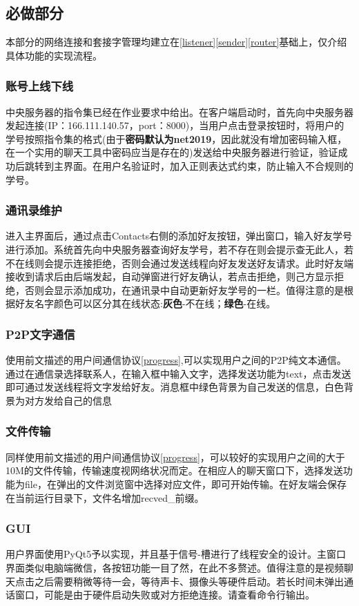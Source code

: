 \documentclass[UTF8]{ctexart}
\begin{document}
\subsection{必做部分}
本部分的网络连接和套接字管理均建立在\ref{listener}\ref{sender}\ref{router}基础上，仅介绍具体功能的实现流程。
\subsubsection{账号上线下线}
中央服务器的指令集已经在作业要求中给出。在客户端启动时，首先向中央服务器发起连接(IP：166.111.140.57，port：8000)，当用户点击登录按钮时，将用户的学号按照指令集的格式(由于\textbf{密码默认为net2019}，因此就没有增加密码输入框，在一个实用的聊天工具中密码应当是存在的)发送给中央服务器进行验证，验证成功后跳转到主界面。在用户名验证时，加入正则表达式约束，防止输入不合规则的学号。
\subsubsection{通讯录维护}
进入主界面后，通过点击Contacts右侧的添加好友按钮，弹出窗口，输入好友学号进行添加。系统首先向中央服务器查询好友学号，若不存在则会提示查无此人，若不在线则会提示连接拒绝，否则会通过发送线程向好友发送好友请求。此时好友端接收到请求后由后端发起，自动弹窗进行好友确认，若点击拒绝，则己方显示拒绝，否则会显示添加成功，在通讯录中自动更新好友学号的一栏。值得注意的是根据好友名字颜色可以区分其在线状态:\textbf{灰色}-不在线；\textbf{绿色}-在线。
\subsubsection{P2P文字通信}
使用前文描述的用户间通信协议\ref{progress},可以实现用户之间的P2P纯文本通信。通过在通信录选择联系人，在输入框中输入文字，选择发送功能为text，点击发送即可通过发送线程将文字发给好友。消息框中绿色背景为自己发送的信息，白色背景为对方发给自己的信息

\subsubsection{文件传输}
同样使用前文描述的用户间通信协议\ref{progress}，可以较好的实现用户之间的大于10M的文件传输，传输速度视网络状况而定。在相应人的聊天窗口下，选择发送功能为file，在弹出的文件浏览窗中选择对应文件，即可开始传输。在好友端会保存在当前运行目录下，文件名增加recved\_前缀。
\subsubsection{GUI}
用户界面使用PyQt5予以实现，并且基于信号-槽进行了线程安全的设计。主窗口界面类似电脑端微信，各按钮功能一目了然，在此不多赘述。值得注意的是视频聊天点击之后需要稍微等待一会，等待声卡、摄像头等硬件启动。若长时间未弹出通话窗口，可能是由于硬件启动失败或对方拒绝连接。请查看命令行输出。
\end{document}
